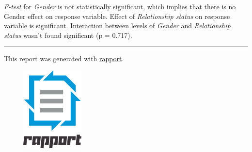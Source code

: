 \documentclass{article}
\makeatletter
\def\maxwidth{\ifdim\Gin@nat@width>\linewidth\linewidth
\else\Gin@nat@width\fi}
\let\Oldincludegraphics\includegraphics
\renewcommand{\includegraphics}[1]{\Oldincludegraphics[width=\maxwidth]{#1}}
\makeatother
\begin{document}
\emph{F-test} for \emph{Gender} is not statistically significant, which
implies that there is no Gender effect on response variable. Effect of
\emph{Relationship status} on response variable is significant.
Interaction between levels of \emph{Gender} and \emph{Relationship
status} wasn't found significant (p = 0.717).

\begin{center}\rule{3in}{0.4pt}\end{center}

This report was generated with
\href{http://rapport-package.info/}{rapport}.

\begin{figure}[htbp]
\centering
\includegraphics{images/rapport.png}
\caption{}
\end{figure}
\end{document}
